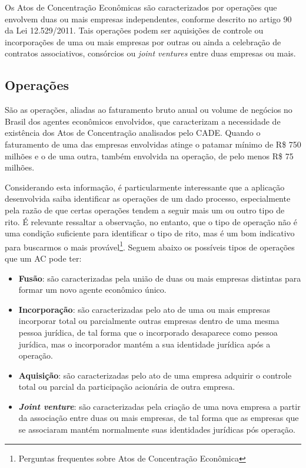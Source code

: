 \documentclass[11pt]{report}
\begin{document}
\indent\indent Os Atos de Concentração Econômicas são caracterizados por operações que envolvem duas ou mais empresas independentes, conforme descrito no artigo 90 da Lei 12.529/2011. Tais operações
podem ser aquisições de controle ou incorporações de uma ou mais empresas por outras ou ainda a celebração de contratos associativos, consórcios ou \textit{joint ventures} entre duas
empresas ou mais.

\subsection{Operações}

\indent\indent São as operações, aliadas ao faturamento bruto anual ou volume de negócios no Brasil dos agentes econômicos envolvidos, que caracterizam a necessidade de existência dos
Atos de Concentração analisados pelo CADE. Quando o faturamento de uma das empresas envolvidas atinge o patamar mínimo de R\$ 750 milhões e o de uma outra, também envolvida na operação,
de pelo menos R\$ 75 milhões.

Considerando esta informação, é particularmente interessante que a aplicação desenvolvida saiba identificar as operações de um dado processo, especialmente
pela razão de que certas operações tendem a seguir mais um ou outro tipo de rito. É relevante ressaltar a observação, no entanto, que o tipo de operação não é uma condição suficiente
para identificar o tipo de rito, mas é um bom indicativo para buscarmos o mais provável\footnote[3]{Perguntas frequentes sobre Atos de Concentração Econômica}. Seguem abaixo
os possíveis tipos de operações que um AC pode ter:

\begin{itemize}
  \item \textbf{Fusão}: são caracterizadas pela união de duas ou mais empresas distintas para formar um novo agente econômico único.
  \item \textbf{Incorporação}: são caracterizadas pelo ato de uma ou mais empresas incorporar total ou parcialmente outras empresas dentro de uma mesma pessoa jurídica,
  de tal forma que o incorporado desaparece como pessoa jurídica, mas o incorporador mantém a sua identidade jurídica após a operação.
  \item \textbf{Aquisição}: são caracterizadas pelo ato de uma empresa adquirir o controle total ou parcial da participação acionária de outra empresa.
  \item \textbf{\textit{Joint venture}}: são caracterizadas pela criação de uma nova empresa a partir da associação entre duas ou mais empresas, de tal forma
  que as empresas que se associaram mantém normalmente suas identidades jurídicas pós operação.
\end{itemize}
\end{document}
